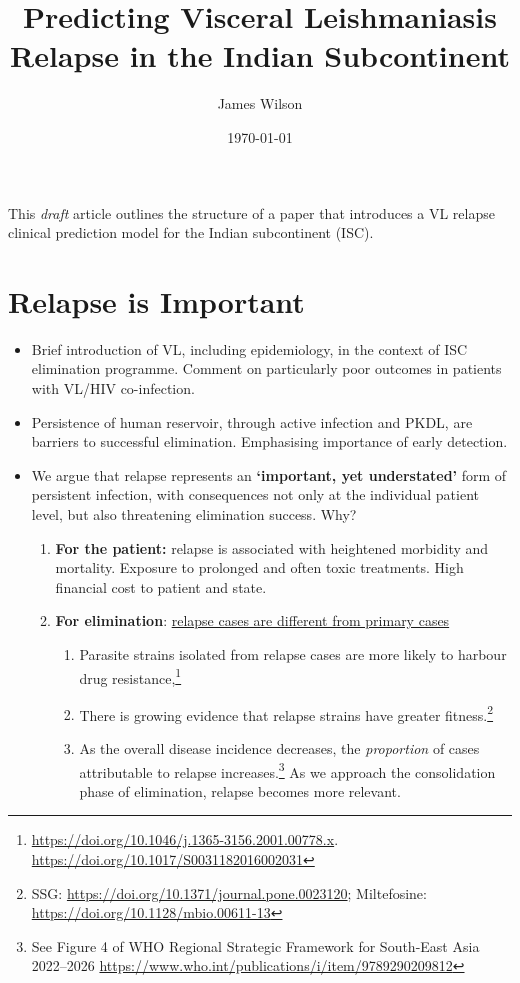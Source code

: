 \documentclass[11pt,a4paper]{article} %
\title{Predicting Visceral Leishmaniasis Relapse in the Indian Subcontinent}
\author{James Wilson}
\date{\today}
\begin{document}
\maketitle
This \textit{draft} article outlines the structure of a paper that introduces a VL relapse clinical prediction model for the Indian subcontinent (ISC).

\section*{Relapse is Important}

\begin{itemize}
  \item Brief introduction of VL, including epidemiology, in the context of ISC elimination programme. Comment on particularly poor outcomes in patients with VL/HIV co-infection.
  \item Persistence of human reservoir, through active infection and PKDL, are barriers to successful elimination. Emphasising importance of early detection.
  \item We argue that relapse represents an \textbf{`important, yet understated'} form of persistent infection, with consequences not only at the individual patient level, but also threatening elimination success. Why?
        \begin{enumerate}
          \item \textbf{For the patient:} relapse is associated with heightened morbidity and mortality. Exposure to prolonged and often toxic treatments. High financial cost to patient and state.
          \item \textbf{For elimination}: \underline{relapse cases are different from primary cases}
                \begin{enumerate}
                  \item Parasite strains isolated from relapse cases are more likely to harbour drug resistance,\footnote{\url{https://doi.org/10.1046/j.1365-3156.2001.00778.x}. \url{https://doi.org/10.1017/S0031182016002031}}
                  \item There is growing evidence that relapse strains have greater fitness.\footnote{SSG: \url{https://doi.org/10.1371/journal.pone.0023120}; Miltefosine: \url{https://doi.org/10.1128/mbio.00611-13}}
                  \item As the overall disease incidence decreases, the \textit{proportion} of cases attributable to relapse increases.\footnote{See Figure 4 of WHO Regional Strategic Framework for South-East Asia 2022--2026 \url{https://www.who.int/publications/i/item/9789290209812}} As we approach the consolidation phase of elimination, relapse becomes more relevant.

\end{enumerate}
\end{enumerate}
\end{itemize}
\end{document}
